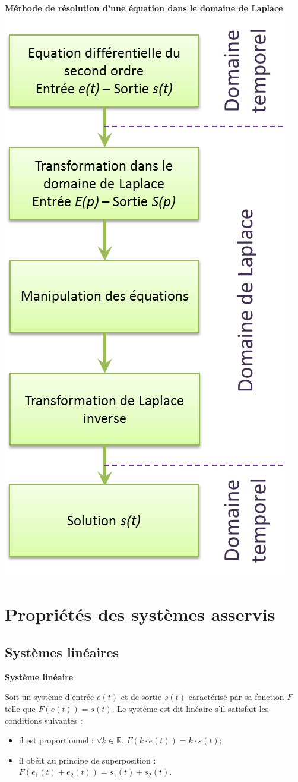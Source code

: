 \documentclass[11pt,oneside]{article}
\begin{document}
\begin{minipage}[c]{.45\linewidth}
\begin{center}
\textbf{Méthode de résolution d'une équation dans le domaine de Laplace}
\includegraphics[width=.7\textwidth]{png/laplace}
\end{center}
\end{minipage} \hfill

\section{Propriétés des systèmes asservis}
\subsection{Systèmes linéaires}
\begin{defi}
\textbf{Système linéaire}

Soit un système d'entrée $e(t)$ et de sortie $s(t)$ caractérisé par sa fonction $F$ telle que $F(e(t))=s(t)$. Le système est dit linéaire s'il satisfait les conditions suivantes : 
\begin{itemize}
\item il est proportionnel : $\forall k \in \mathbb{R}$, $F(k\cdot e(t))=k\cdot s(t)$;
\item il obéit au principe de superposition : $F(e_1(t)+e_2(t))=s_1(t)+s_2(t)$.
\end{itemize}
\end{defi}
\end{document}
